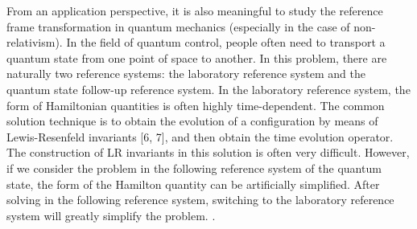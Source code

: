 \documentclass{article}
\begin{document}
        From an application perspective, it is also meaningful to study the reference frame transformation in quantum mechanics (especially in the case of non-relativism). In the field of quantum control, people often need to transport a quantum state from one point of space to another. In this problem, there are naturally two reference systems: the laboratory reference system and the quantum state follow-up reference system. In the laboratory reference system, the form of Hamiltonian quantities is often highly time-dependent. The common solution technique is to obtain the evolution of a configuration by means of Lewis-Resenfeld invariants [6, 7], and then obtain the time evolution operator. The construction of LR invariants in this solution is often very difficult. However, if we consider the problem in the following reference system of the quantum state, the form of the Hamilton quantity can be artificially simplified. After solving in the following reference system, switching to the laboratory reference system will greatly simplify the problem. .
\end{document}
